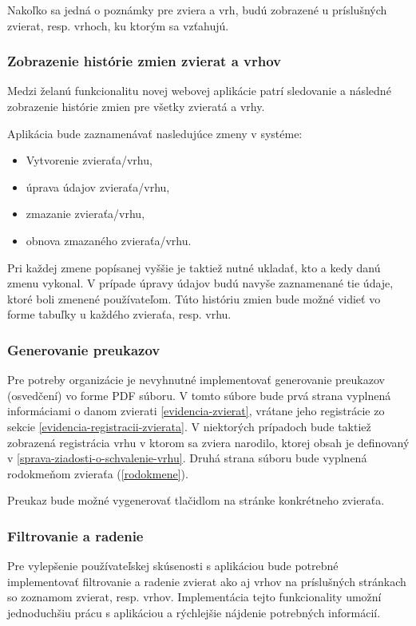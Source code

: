 Nakoľko sa jedná o poznámky pre zviera a vrh, budú zobrazené u príslušných zvierat, resp. vrhoch, ku ktorým sa vzťahujú.

\pagebreak

\subsubsection{Zobrazenie histórie zmien zvierat a vrhov}
Medzi želanú funkcionalitu novej webovej aplikácie patrí sledovanie a následné zobrazenie histórie zmien pre všetky zvieratá a vrhy.

Aplikácia bude zaznamenávať nasledujúce zmeny v systéme:
\begin{itemize}
	\item Vytvorenie zvieraťa/vrhu,
	\item úprava údajov zvieraťa/vrhu,
	\item zmazanie zvieraťa/vrhu,
	\item obnova zmazaného zvieraťa/vrhu.
\end{itemize}

Pri každej zmene popísanej vyššie je taktiež nutné ukladať, kto a kedy danú zmenu vykonal. V prípade úpravy údajov budú navyše zaznamenané tie údaje, ktoré boli zmenené používateľom. Túto históriu zmien bude možné vidieť vo forme tabuľky u každého zvieraťa, resp. vrhu.

\subsubsection{Generovanie preukazov}\label{generovanie-preukazov}
Pre potreby organizácie je nevyhnutné implementovať generovanie preukazov (osvedčení) vo forme PDF súboru. V tomto súbore bude prvá strana vyplnená informáciami o danom zvierati \ref{evidencia-zvierat}, vrátane jeho registrácie zo sekcie \ref{evidencia-registracii-zvierata}. V niektorých prípadoch bude taktiež zobrazená registrácia vrhu v ktorom sa zviera narodilo, ktorej obsah je definovaný v \ref{sprava-ziadosti-o-schvalenie-vrhu}. Druhá strana súboru bude vyplnená rodokmeňom zvieraťa (\ref{rodokmene}).

Preukaz bude možné vygenerovať tlačidlom na stránke konkrétneho zvieraťa.

\subsubsection{Filtrovanie a radenie}\label{filtrovanie-a-radenie}
Pre vylepšenie používateľskej skúsenosti s aplikáciou bude potrebné implementovať filtrovanie a radenie zvierat ako aj vrhov na príslušných stránkach so zoznamom zvierat, resp. vrhov. Implementácia tejto funkcionality umožní jednoduchšiu prácu s aplikáciou a rýchlejšie nájdenie potrebných informácií.

